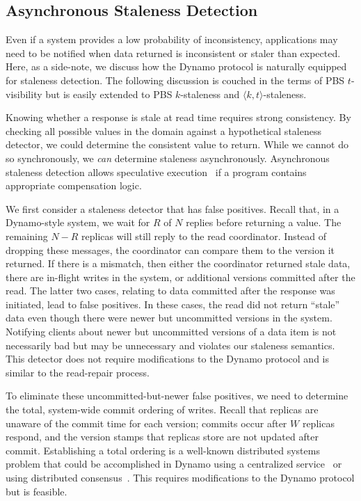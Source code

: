 \documentclass{vldb}
\newcommand{\subsectionskip}{-0em}
\begin{document}
\vspace{\subsectionskip}\subsection{Asynchronous Staleness Detection}

Even if a system provides a low probability of inconsistency,
applications may need to be notified when data returned is
inconsistent or staler than expected.  Here, as a side-note, we
discuss how the Dynamo protocol is naturally equipped for staleness
detection.  The following discussion is couched in the terms of PBS
$t$-visibility but is easily extended to PBS $k$-staleness and
$\langle k, t \rangle$-staleness.

Knowing whether a response is stale at read time requires strong
consistency.  By checking all possible values in the domain against a
hypothetical staleness detector, we could determine the consistent
value to return.  While we cannot do so synchronously, we \textit{can}
determine staleness asynchronously.  Asynchronous staleness detection
allows speculative execution~\cite{nsdispeculation} if a program
contains appropriate compensation logic.

We first consider a staleness detector that has false positives.
Recall that, in a Dynamo-style system, we wait for $R$ of $N$ replies
before returning a value.  The remaining $N-R$ replicas will still
reply to the read coordinator.  Instead of dropping these messages,
the coordinator can compare them to the version it returned.  If there
is a mismatch, then either the coordinator returned stale data, there
are in-flight writes in the system, or additional versions committed
after the read. The latter two cases, relating to data committed after
the response was initiated, lead to false positives.  In these cases,
the read did not return ``stale'' data even though there were newer
but uncommitted versions in the system.  Notifying clients about newer
but uncommitted versions of a data item is not necessarily bad but may
be unnecessary and violates our staleness semantics.  This detector
does not require modifications to the Dynamo protocol and is similar
to the read-repair process.

To eliminate these uncommitted-but-newer false positives, we need to
determine the total, system-wide commit ordering of writes. Recall
that replicas are unaware of the commit time for each version; commits
occur after $W$ replicas respond, and the version stamps that replicas
store are not updated after commit.  Establishing a total ordering is
a well-known distributed systems problem that could be accomplished in
Dynamo using a centralized service~\cite{zookeeper} or using
distributed consensus~\cite{paxos}. This requires modifications to the
Dynamo protocol but is feasible.
\end{document}
